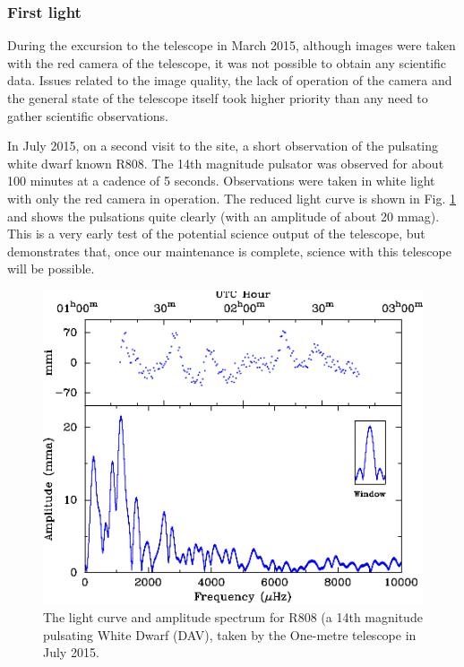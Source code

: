 \documentclass[a4paper,fleqn,usenatbib]{mnras}
\begin{document}
\subsubsection{First light}
During the excursion to the telescope in March 2015, although images were taken with the red camera of the telescope, it was not possible to obtain any scientific data. Issues related to the image quality, the lack of operation of the camera and the general state of the telescope itself took higher priority than any need to gather scientific observations. 

In July 2015, on a second visit to the site, a short observation of the pulsating white dwarf known R808. The 14th magnitude pulsator was observed for about 100 minutes at a cadence of 5 seconds. Observations were taken in white light with only the red camera in operation.  The reduced light curve is shown in Fig. \ref{fig:r808} and shows the pulsations quite clearly (with an amplitude of about 20 mmag). This is a very early test of the potential science output of the telescope, but demonstrates that, once our maintenance is complete, science with this telescope will be possible.

\begin{figure}
	\includegraphics[width=\columnwidth]{images/r808.pdf}
    \caption{The light curve and amplitude spectrum for R808 (a 14th magnitude pulsating White Dwarf (DAV), taken by the One-metre telescope in July 2015.}
    \label{fig:r808}
\end{figure}
 
\end{document}
